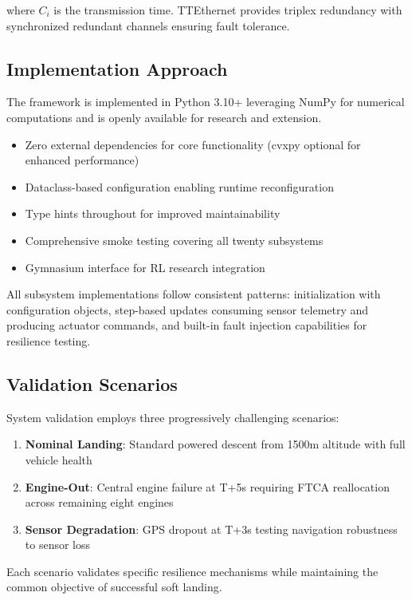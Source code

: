 \documentclass[10pt, conference, compsocconf]{IEEEtran}
\begin{document}
where $C_i$ is the transmission time. TTEthernet provides triplex redundancy with synchronized redundant channels ensuring fault tolerance\cite{tttechethernet}.

\subsection{Implementation Approach}

The framework is implemented in Python 3.10+ leveraging NumPy for numerical computations and is openly available for research and extension\cite{rocketoscodebase}.

\begin{itemize}
\item Zero external dependencies for core functionality (cvxpy optional for enhanced performance)
\item Dataclass-based configuration enabling runtime reconfiguration
\item Type hints throughout for improved maintainability
\item Comprehensive smoke testing covering all twenty subsystems
\item Gymnasium interface for RL research integration
\end{itemize}

All subsystem implementations follow consistent patterns: initialization with configuration objects, step-based updates consuming sensor telemetry and producing actuator commands, and built-in fault injection capabilities for resilience testing.

\subsection{Validation Scenarios}

System validation employs three progressively challenging scenarios:

\begin{enumerate}
\item \textbf{Nominal Landing}: Standard powered descent from 1500m altitude with full vehicle health
\item \textbf{Engine-Out}: Central engine failure at T+5s requiring FTCA reallocation across remaining eight engines\cite{mdpiftca}
\item \textbf{Sensor Degradation}: GPS dropout at T+3s testing navigation robustness to sensor loss\cite{ijertekf}
\end{enumerate}

Each scenario validates specific resilience mechanisms while maintaining the common objective of successful soft landing.
\end{document}
